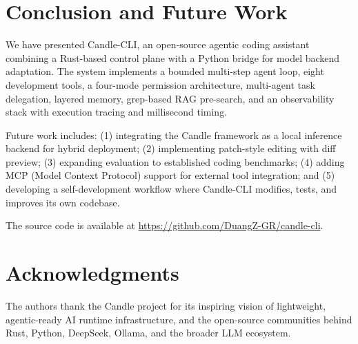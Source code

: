 \documentclass[11pt]{article}
\begin{document}
\section{Conclusion and Future Work}
\label{sec:conclusion}

We have presented Candle-CLI, an open-source agentic coding assistant combining a Rust-based control plane with a Python bridge for model backend adaptation. The system implements a bounded multi-step agent loop, eight development tools, a four-mode permission architecture, multi-agent task delegation, layered memory, grep-based RAG pre-search, and an observability stack with execution tracing and millisecond timing.

Future work includes: (1) integrating the Candle framework as a local inference backend for hybrid deployment; (2) implementing patch-style editing with diff preview; (3) expanding evaluation to established coding benchmarks; (4) adding MCP (Model Context Protocol) support for external tool integration; and (5) developing a self-development workflow where Candle-CLI modifies, tests, and improves its own codebase.

The source code is available at \url{https://github.com/DuangZ-GR/candle-cli}.

\section*{Acknowledgments}

The authors thank the Candle project for its inspiring vision of lightweight, agentic-ready AI runtime infrastructure, and the open-source communities behind Rust, Python, DeepSeek, Ollama, and the broader LLM ecosystem.
\end{document}

